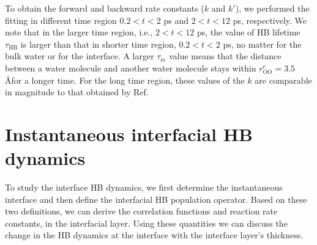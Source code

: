 To obtain the forward and backward rate constants ($k$ and $k'$),
we performed the fitting in different time region $0.2 < t < 2$ ps and $2 < t < 12$ ps, respectively.
We note that in the larger time region, i.e., $2 < t < 12$ ps, the value of HB lifetime $\tau_\text{HB}$ is larger than that in shorter time region, $0.2 < t < 2$ ps,
no matter for the bulk water or for the interface. A larger $\tau_\text{re}$ value means that the distance between a water molecule and another water molecule 
stays within $r_\text{OO}^c= 3.5$ \AA for a longer time. 
For the long time region, these values of the $k$ are comparable in magnitude to that obtained by Ref. 


\section{Instantaneous interfacial HB dynamics}

To study the interface HB dynamics, we first determine the instantaneous interface and then define the interfacial HB population operator. 
Based on these two definitions, we can derive the correlation functions and reaction rate constants, in the interfacial layer. 
Using these quantities we can discuss the change in the HB dynamics at the interface with the interface layer's thickness.

